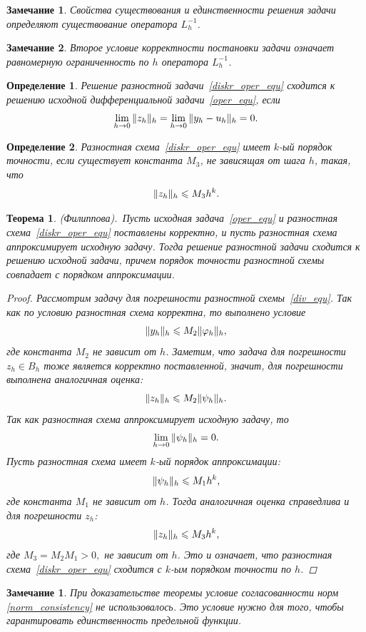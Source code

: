 \documentclass[11pt,a4paper,twoside,listtotoc,bibtotoc]{report}
\numberwithin{equation}{section}
\newtheorem*{definition}{Определение}
\theoremstyle{definition}
\theoremstyle{plain}
\newtheorem{theorem}{Теорема}[section]
\newtheorem{note}{Замечание}[section]
\newtheorem*{note*}{Замечание}
\DeclarePairedDelimiter\norm{\lVert}{\rVert}
\begin{document}
%
%
\begin{note}
%
    Свойства существования и единственности решения задачи определяют существование
    оператора $L_h^{-1}$.
%
\end{note}
%
%
\begin{note}
%
    Второе условие корректности постановки задачи означает
    равномерную ограниченность по $h$ оператора $L_h^{-1}$.
%
\end{note}
%
%
\begin{definition}
%
    Решение разностной задачи~\eqref{diskr_oper_equ} сходится к решению исходной
    дифференциальной задачи~\eqref{oper_equ}, если
    $$
        \lim_{h\rightarrow0}{\norm{z_h}_h}=\lim_{h\rightarrow0}{\norm{y_h-u_h}_h}=0.
    $$
%
\end{definition}
%
%
\begin{definition}
%
    Разностная схема~\eqref{diskr_oper_equ} имеет $k$-ый порядок точности, если
    существует константа $M_3$, не зависящая от шага $h$, такая, что
    $$
        \norm{z_h}_h \leqslant M_3h^k.
    $$
%
\end{definition}
%
%
\begin{theorem}
%
    (Филиппова).~Пусть исходная задача~\eqref{oper_equ} и разностная
    схема~\eqref{diskr_oper_equ}
     поставлены корректно, и пусть разностная схема аппроксимирует исходную задачу.
    Тогда решение разностной задачи сходится к
    решению исходной задачи, причем порядок точности разностной схемы совпадает
    с порядком аппроксимации.
    \begin{proof}
        Рассмотрим задачу для погрешности разностной схемы~\eqref{div_equ}.
        Так как по условию разностная схема корректна, то выполнено условие
        $$
            \norm{y_h}_h \leqslant M_2 \norm{\varphi_h}_h,
        $$
        где константа $M_2$ не зависит от $h$. Заметим, что задача для
        погрешности $z_h \in B_h$ тоже является корректно поставленной, значит,
        для погрешности выполнена аналогичная оценка:
        $$
            \norm{z_h}_h \leqslant M_2\norm{\psi_h}_h.
        $$
        Так как разностная схема аппроксимирует исходную задачу, то
        $$
            \lim_{h\rightarrow0}{\norm{\psi_h}_h}=0.
        $$
        Пусть разностная схема имеет $k$-ый порядок аппроксимации:
        $$
            \norm{\psi_h}_h \leqslant M_1h^k,
        $$
        где константа $M_1$ не зависит от $h$. Тогда аналогичная оценка справедлива и
        для погрешности $z_h$:
        $$
            \norm{z_h}_h \leqslant M_3h^k,
        $$
        где $M_3=M_2M_1 >0,$ не зависит от $h$. Это и означает,
        что разностная схема~\eqref{diskr_oper_equ} сходится с $k$-ым порядком
        точности по $h$.
    \end{proof}
%
\end{theorem}
%
%
\begin{note*}
%
При доказательстве теоремы условие согласованности норм \eqref{norm_consistency}
не использовалось. Это условие нужно для того, чтобы гарантировать
единственность предельной функции.
%
\end{note*}
%
\end{document}
